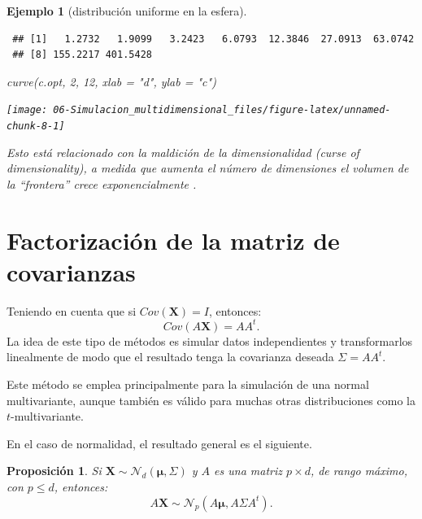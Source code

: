 \documentclass[
  10pt,
]{book}
\newenvironment{Shaded}{\begin{snugshade}}{\end{snugshade}}
\newcommand{\AttributeTok}[1]{\textcolor[rgb]{0.77,0.63,0.00}{#1}}
\newcommand{\DecValTok}[1]{\textcolor[rgb]{0.00,0.00,0.81}{#1}}
\newcommand{\FunctionTok}[1]{\textcolor[rgb]{0.00,0.00,0.00}{#1}}
\newcommand{\NormalTok}[1]{#1}
\newcommand{\StringTok}[1]{\textcolor[rgb]{0.31,0.60,0.02}{#1}}
\renewcommand{\boldsymbol}[1]{\symbf{#1}}
\renewcommand{\mathbf}[1]{\symbf{#1}}
\theoremstyle{break}
\newtheorem{proposition}{Proposición}[chapter]
\newtheorem{example}{Ejemplo}[chapter]
\theoremstyle{nonumberplain}
\begin{document}
\begin{example}[distribución uniforme en la esfera]
\begin{verbatim}
 ## [1]   1.2732   1.9099   3.2423   6.0793  12.3846  27.0913  63.0742
 ## [8] 155.2217 401.5428
\end{verbatim}

\begin{Shaded}
\begin{Highlighting}[]
\FunctionTok{curve}\NormalTok{(c.opt, }\DecValTok{2}\NormalTok{, }\DecValTok{12}\NormalTok{, }\AttributeTok{xlab =} \StringTok{"d"}\NormalTok{, }\AttributeTok{ylab =} \StringTok{"c"}\NormalTok{)}
\end{Highlighting}
\end{Shaded}

\begin{center}\texttt{[image: 06-Simulacion\_multidimensional\_files/figure-latex/unnamed-chunk-8-1]} \end{center}

Esto está relacionado con la \emph{maldición de la dimensionalidad} (curse of dimensionality), a medida que aumenta el número de dimensiones el volumen de la ``frontera'' crece exponencialmente \citep[ver p.e.][\href{https://rubenfcasal.github.io/aprendizaje_estadistico/dimen-curse.html}{sec.~1.4}]{mpaebook2024}.
\end{example}

\hypertarget{fact-cov}{%
\section{Factorización de la matriz de covarianzas}\label{fact-cov}}

Teniendo en cuenta que si \(Cov(\mathbf{X})= I\), entonces:
\[Cov(A\mathbf{X}) = AA^t.\]
La idea de este tipo de métodos es simular datos independientes y transformarlos linealmente de modo que el resultado tenga la covarianza deseada \(\Sigma = AA^t\).

Este método se emplea principalmente para la simulación de una
normal multivariante, aunque también es válido para muchas otras
distribuciones como la \(t\)-multivariante.

En el caso de normalidad, el resultado general es el siguiente.

\begin{proposition}
Si \(\mathbf{X} \sim \mathcal{N}_d\left( \boldsymbol{\mu},\Sigma \right)\) y \(A\) es una matriz \(p\times d\), de
rango máximo, con \(p\leq d\), entonces:
\[A\mathbf{X} \sim \mathcal{N}_{p}\left(A\boldsymbol{\mu},A\Sigma A^t\right).\]
\end{proposition}
\end{document}
